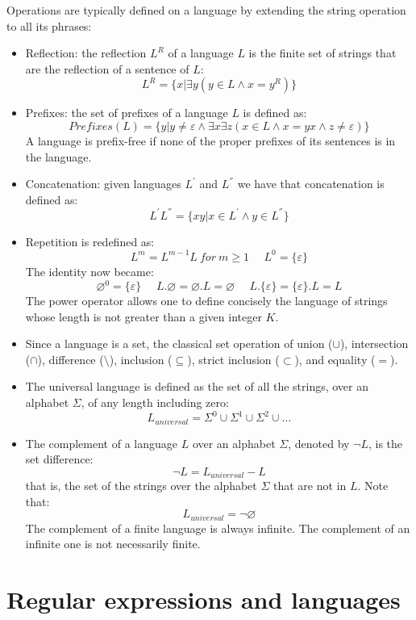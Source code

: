 \documentclass[12pt, a4paper]{report}
\newtheorem[style=M,bodystyle=\normalfont]{theorem}{Theorem}
\newtheorem[style=M,bodystyle=\normalfont]{corollary}{Corollary}
\newtheorem[style=M,bodystyle=\normalfont]{lemma}{Lemma}
\newtheorem[style=M,bodystyle=\normalfont]{definition}{Definition}
\begin{document}
    Operations are typically defined on a language by extending the string operation to all its phrases: 
    \begin{itemize}
        \item Reflection: the reflection $L^R$ of a language $L$ is the finite set of strings that are the reflection of a sentence of $L$: 
            \[L^R = \{ x | \exists y \left( y \in L \land x=y^R \right)\}\]
        \item Prefixes: the set of prefixes of a language $L$ is defined as: 
            \[Prefixes(L)=\{y | y \neq \varepsilon \land \exists x \exists z \left( x \in L \land x=yx \land z \neq \varepsilon \right)\}\]
            A language is prefix-free if none of the proper prefixes of its sentences is in the language. 
        \item Concatenation: given languages $L^{'}$ and $L^{''}$ we have that concatenation is defined as: 
            \[L^{'}L^{''}=\{ xy | x \in L^{'} \land y \in L^{''} \}\]
        \item Repetition is redefined as: 
            \[L^m=L^{m-1}L \:for \: m \geq 1 \:\:\:\:\:\: L^0=\{ \varepsilon \}\]
            The identity now became: 
            \[\varnothing ^0 = \{ \varepsilon \} \:\:\:\:\:\: L.\varnothing=\varnothing .L=\varnothing \:\:\:\:\:\: L.\{\varepsilon\}=\{\varepsilon\} .L=L\]
            The power operator allows one to define concisely the language of strings whose length is not greater than a given integer $K$. 
        \item Since a language is a set, the classical set operation of union ($\cup$), intersection ($\cap$), difference ($ \setminus $), inclusion ($ \subseteq $), strict 
            inclusion ($ \subset $), and equality ($=$). 
        \item The universal language is defined as the set of all the strings, over an alphabet $\Sigma$, of any length including zero: 
            \[L_{universal}=\Sigma ^0 \cup \Sigma ^1 \cup \Sigma ^2 \cup \dots \]
        \item The complement of a language $L$ over an alphabet $\Sigma$, denoted by $\lnot L$, is the set difference: 
            \[ \lnot L = L_{universal} - L\]
            that is, the set of the strings over the alphabet $\Sigma$ that are not in $L$. Note that: 
            \[ L_{universal} = \lnot \varnothing \]
            The complement of a finite language is always infinite. The complement of an infinite one is not necessarily finite. 
    \end{itemize}








    \section{Regular expressions and languages}
\end{document}
